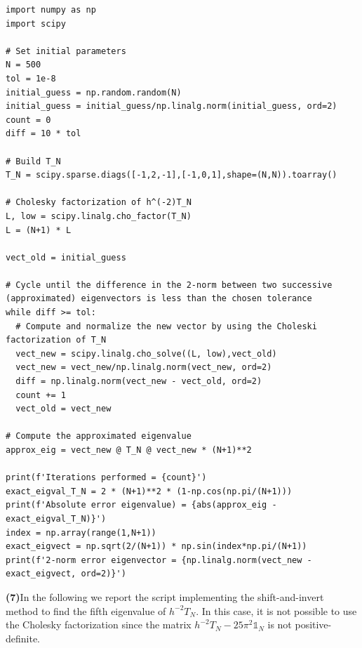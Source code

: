 \documentclass[a4paper,11pt]{article}
\begin{document}
\begin{verbatim}
import numpy as np
import scipy

# Set initial parameters
N = 500
tol = 1e-8
initial_guess = np.random.random(N)
initial_guess = initial_guess/np.linalg.norm(initial_guess, ord=2)
count = 0
diff = 10 * tol

# Build T_N
T_N = scipy.sparse.diags([-1,2,-1],[-1,0,1],shape=(N,N)).toarray()

# Cholesky factorization of h^(-2)T_N
L, low = scipy.linalg.cho_factor(T_N)
L = (N+1) * L

vect_old = initial_guess

# Cycle until the difference in the 2-norm between two successive (approximated) eigenvectors is less than the chosen tolerance
while diff >= tol:
  # Compute and normalize the new vector by using the Choleski factorization of T_N
  vect_new = scipy.linalg.cho_solve((L, low),vect_old)
  vect_new = vect_new/np.linalg.norm(vect_new, ord=2)
  diff = np.linalg.norm(vect_new - vect_old, ord=2)
  count += 1
  vect_old = vect_new

# Compute the approximated eigenvalue
approx_eig = vect_new @ T_N @ vect_new * (N+1)**2

print(f'Iterations performed = {count}')
exact_eigval_T_N = 2 * (N+1)**2 * (1-np.cos(np.pi/(N+1)))
print(f'Absolute error eigenvalue) = {abs(approx_eig - exact_eigval_T_N)}')
index = np.array(range(1,N+1))
exact_eigvect = np.sqrt(2/(N+1)) * np.sin(index*np.pi/(N+1))
print(f'2-norm error eigenvector = {np.linalg.norm(vect_new - exact_eigvect, ord=2)}')
\end{verbatim}


\noindent \textbf{(7)}In the following we report the script implementing the shift-and-invert method to find the fifth eigenvalue of $h^{-2}T_{N}$. In this case, it is not possible to use the Cholesky factorization since the matrix $h^{-2}T_{N} - 25\pi^2\mathbb{1}_{N}$ is not positive-definite.
\end{document}
